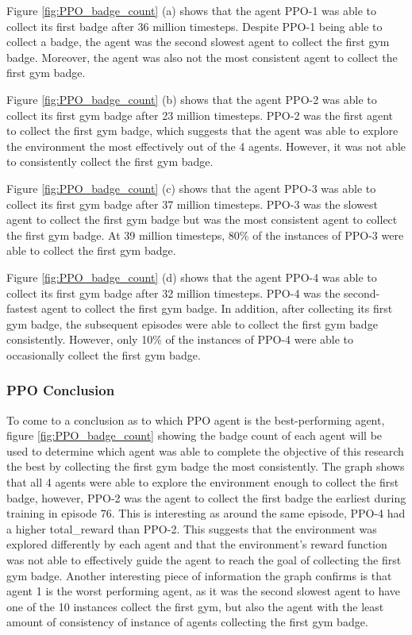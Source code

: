 Figure \ref{fig:PPO_badge_count} (a) shows that the agent PPO-1 was able to collect its first badge after 36 million timesteps. Despite PPO-1 being able to collect a badge, the agent was the second slowest agent to collect the first gym badge. Moreover, the agent was also not the most consistent agent to collect the first gym badge.

Figure \ref{fig:PPO_badge_count} (b) shows that the agent PPO-2 was able to collect its first gym badge after 23 million timesteps. PPO-2 was the first agent to collect the first gym badge, which suggests that the agent was able to explore the environment the most effectively out of the 4 agents. However, it was not able to consistently collect the first gym badge.

Figure \ref{fig:PPO_badge_count} (c) shows that the agent PPO-3 was able to collect its first gym badge after 37 million timesteps. PPO-3 was the slowest agent to collect the first gym badge but was the most consistent agent to collect the first gym badge. At 39 million timesteps, 80\% of the instances of PPO-3 were able to collect the first gym badge.

Figure \ref{fig:PPO_badge_count} (d) shows that the agent PPO-4 was able to collect its first gym badge after 32 million timesteps. PPO-4 was the second-fastest agent to collect the first gym badge. In addition, after collecting its first gym badge, the subsequent episodes were able to collect the first gym badge consistently. However, only 10\% of the instances of PPO-4 were able to occasionally collect the first gym badge.

\subsubsection{PPO Conclusion} 

To come to a conclusion as to which PPO agent is the best-performing agent, figure \ref{fig:PPO_badge_count} showing the badge count of each agent will be used to determine which agent was able to complete the objective of this research the best by collecting the first gym badge the most consistently. The graph shows that all 4 agents were able to explore the environment enough to collect the first badge, however, PPO-2 was the agent to collect the first badge the earliest during training in episode 76. This is interesting as around the same episode, PPO-4 had a higher total\_reward than PPO-2. This suggests that the environment was explored differently by each agent and that the environment's reward function was not able to effectively guide the agent to reach the goal of collecting the first gym badge. Another interesting piece of information the graph confirms is that agent 1 is the worst performing agent, as it was the second slowest agent to have one of the 10 instances collect the first gym, but also the agent with the least amount of consistency of instance of agents collecting the first gym badge. 

